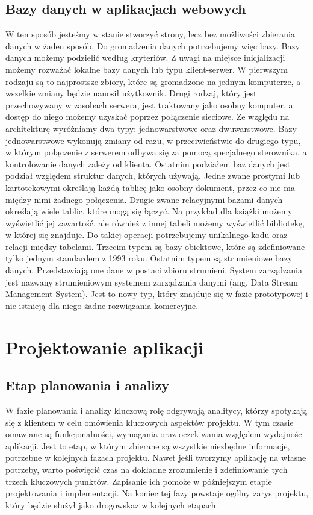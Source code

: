 \subsection{Bazy danych w aplikacjach webowych}

W ten sposób jesteśmy w stanie stworzyć strony, lecz bez możliwości zbierania danych w żaden sposób. Do gromadzenia danych potrzebujemy więc bazy. Bazy danych możemy podzielić według kryteriów. Z uwagi na miejsce inicjalizacji możemy rozważać lokalne bazy danych lub typu klient-serwer. W pierwszym rodzaju są to najprostsze zbiory, które są gromadzone na jednym komputerze, a wszelkie zmiany będzie nanosił użytkownik. Drugi rodzaj, który jest przechowywany w zasobach serwera, jest traktowany jako osobny komputer, a dostęp do niego możemy uzyskać poprzez połączenie sieciowe. Ze względu na architekturę wyróżniamy dwa typy: jednowarstwowe oraz dwuwarstwowe. Bazy jednowarstwowe wykonują zmiany od razu, w przeciwieństwie do drugiego typu, w którym połączenie z serwerem odbywa się za pomocą specjalnego sterownika, a kontrolowanie danych zależy od klienta. Ostatnim podziałem baz danych jest podział względem struktur danych, których używają. Jedne zwane prostymi lub kartotekowymi określają każdą tablicę jako osobny dokument, przez co nie ma między nimi żadnego połączenia. Drugie zwane relacyjnymi bazami danych określają wiele tablic, które mogą się łączyć. Na przykład dla książki możemy wyświetlić jej zawartość, ale również z innej tabeli możemy wyświetlić bibliotekę, w której się znajduje. Do takiej operacji potrzebujemy unikalnego kodu oraz relacji między tabelami. Trzecim typem są bazy obiektowe, które są zdefiniowane tylko jednym standardem z 1993 roku. Ostatnim typem są strumieniowe bazy danych. Przedstawiają one dane w postaci zbioru strumieni. System zarządzania jest nazwany strumieniowym systemem zarządzania danymi (ang. Data Stream Management System). Jest to nowy typ, który znajduje się w fazie prototypowej i nie istnieją dla niego żadne rozwiązania komercyjne.

\section{Projektowanie aplikacji}
\subsection{Etap planowania i analizy}

W fazie planowania i analizy kluczową rolę odgrywają analitycy, którzy spotykają się z klientem w celu omówienia kluczowych aspektów projektu. W tym czasie omawiane są funkcjonalności, wymagania oraz oczekiwania względem wydajności aplikacji. Jest to etap, w którym zbierane są wszystkie niezbędne informacje, potrzebne w kolejnych fazach projektu. Nawet jeśli tworzymy aplikację na własne potrzeby, warto poświęcić czas na dokładne zrozumienie i zdefiniowanie tych trzech kluczowych punktów. Zapisanie ich pomoże w późniejszym etapie projektowania i implementacji. Na koniec tej fazy powstaje ogólny zarys projektu, który będzie służył jako drogowskaz w kolejnych etapach\cite{Etapy}.

